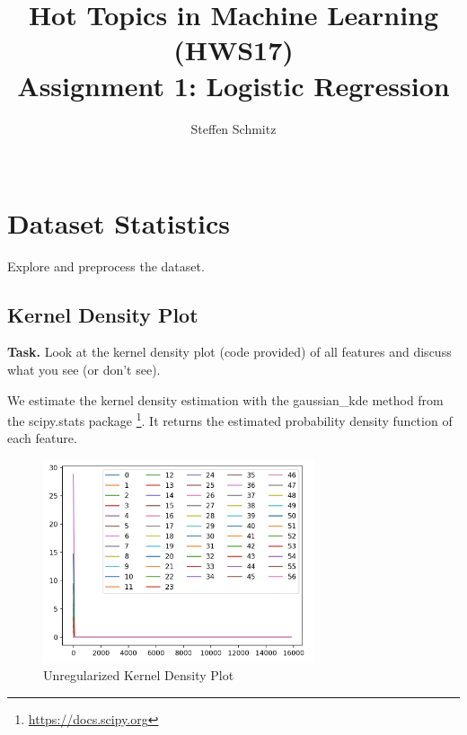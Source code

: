 \documentclass{support/acm_proc_article-sp}
\begin{document}
    \title{Hot Topics in Machine Learning (HWS17) \\ Assignment 1: Logistic Regression}

    \author{
    \alignauthor
    Steffen Schmitz\\
    \\
    }

    \maketitle



    \section{Dataset Statistics}
    \vspace{1.5\baselineskip}

    Explore and preprocess the dataset.

    \subsection{Kernel Density Plot}
    \vspace{\baselineskip}

    \textbf{Task.} Look at the kernel density plot (code provided) of all features and discuss what you see (or don't see).

    We estimate the kernel density estimation with the gaussian\_kde method from the scipy.stats package
    \footnote{\href{https://docs.scipy.org/doc/scipy/reference/generated/scipy.stats.gaussian_kde.html}{https://docs.scipy.org}}.
    It returns the estimated probability density function of each feature.

    \begin{figure}[!htbp]
        \centering
        \includegraphics[width=8cm]{images/plot.png}
        \caption{Unregularized Kernel Density Plot}
        \label{fig:kernel-density-plot}
    \end{figure}
\end{document}
